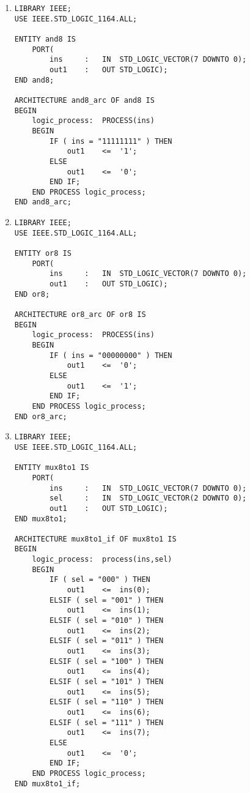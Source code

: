 \begin{enumerate}
\begin{lstlisting}
ENTITY Exercise_5_3 IS
	PORT(
		A,B		:	IN	STD_LOGIC_VECTOR(1 DOWNTO 0);
		D		:	IN	STD_LOGIC;
		E_out	:	OUT	STD_LOGIC);
END Exercise_5_3;

ARCHITECTURE Exercise_5_3_arc OF Exercise_5_3 IS
	SIGNAL Aout,Bout,Cout,Dout	:	STD_LOGIC;
BEGIN
	Aout	<=	A(1) AND A(2);
	Bout	<=	B(1) OR B(2);
	Cout	<=	B(2) AND Dout;
	Dout	<=	NOT D;
	E_out	<=	Aout OR Bout OR Cout;
END Exercise_5_3_arc;
	\end{lstlisting}

	\item
	\begin{lstlisting}
LIBRARY IEEE;
USE IEEE.STD_LOGIC_1164.ALL;

ENTITY and8 IS
	PORT(
		ins		:	IN	STD_LOGIC_VECTOR(7 DOWNTO 0);
		out1	:	OUT	STD_LOGIC);
END and8;

ARCHITECTURE and8_arc OF and8 IS
BEGIN
	logic_process:	PROCESS(ins)
	BEGIN
		IF ( ins = "11111111" ) THEN
			out1	<=	'1';
		ELSE
			out1	<=	'0';
		END IF;
	END PROCESS logic_process;
END and8_arc;
	\end{lstlisting}

	\item
	\begin{lstlisting}
LIBRARY IEEE;
USE IEEE.STD_LOGIC_1164.ALL;

ENTITY or8 IS
	PORT(
		ins		:	IN	STD_LOGIC_VECTOR(7 DOWNTO 0);
		out1	:	OUT	STD_LOGIC);
END or8;

ARCHITECTURE or8_arc OF or8 IS
BEGIN
	logic_process:	PROCESS(ins)
	BEGIN
		IF ( ins = "00000000" ) THEN
			out1	<=	'0';
		ELSE
			out1	<=	'1';
		END IF;
	END PROCESS logic_process;
END or8_arc;
	\end{lstlisting}

	\item
	\begin{lstlisting}
LIBRARY IEEE;
USE IEEE.STD_LOGIC_1164.ALL;

ENTITY mux8to1 IS
	PORT(
		ins		:	IN	STD_LOGIC_VECTOR(7 DOWNTO 0);
		sel		:	IN	STD_LOGIC_VECTOR(2 DOWNTO 0);
		out1	:	OUT	STD_LOGIC);
END mux8to1;

ARCHITECTURE mux8to1_if OF mux8to1 IS
BEGIN
	logic_process:	process(ins,sel) 
	BEGIN
		IF ( sel = "000" ) THEN
			out1	<=	ins(0);
		ELSIF ( sel = "001" ) THEN
			out1	<=	ins(1);
		ELSIF ( sel = "010" ) THEN
			out1	<=	ins(2);
		ELSIF ( sel = "011" ) THEN
			out1	<=	ins(3);
		ELSIF ( sel = "100" ) THEN
			out1	<=	ins(4);
		ELSIF ( sel = "101" ) THEN
			out1	<=	ins(5);
		ELSIF ( sel = "110" ) THEN
			out1	<=	ins(6);
		ELSIF ( sel = "111" ) THEN
			out1	<=	ins(7);
		ELSE
			out1	<=	'0';
		END IF;
	END PROCESS logic_process;
END mux8to1_if;


\end{lstlisting}
\end{enumerate}
